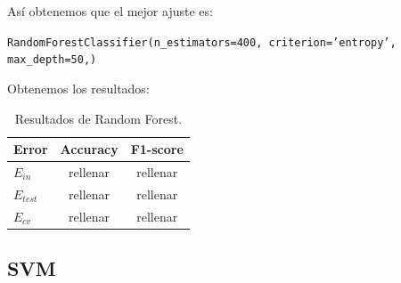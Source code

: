 \documentclass[11pt,a4paper]{article}
\begin{document}
Así obtenemos que el mejor ajuste es:

{\begin{center}
    \texttt{RandomForestClassifier(n\_estimators=400, criterion='entropy', max\_depth=50,)}\end{center}}
    
Obtenemos los resultados:

\begin{table}[h]
\begin{center}
\begin{tabular}{|l|c|c|}
\hline
  Error & Accuracy & F1-score \\ \hline
  $E_{in}$ & rellenar & rellenar \\
  $E_{test}$ & rellenar & rellenar  \\
  $E_{cv}$ & rellenar & rellenar  \\\hline
\end{tabular}
\caption{Resultados de Random Forest.}
\end{center}
\end{table}

\subsection{SVM\cite{svc}}
\end{document}
